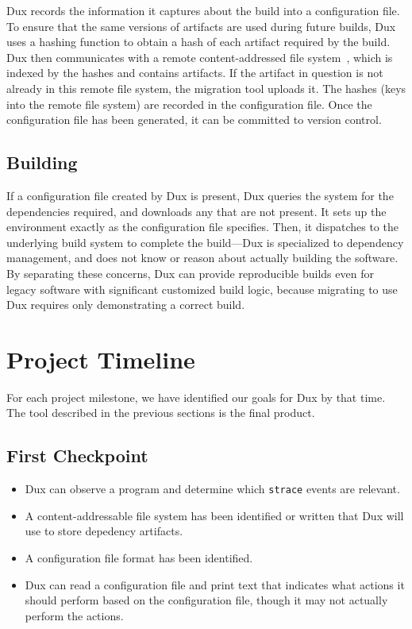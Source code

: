 \documentclass[10pt,conference]{IEEEtran}
\begin{document}
Dux records the information it captures about the build into a configuration file.
To ensure that the same versions of artifacts are used during future builds,
Dux uses a hashing function to obtain a hash of each artifact required by the build.
Dux then communicates with a remote content-addressed file system~\cite{venti},
which is indexed by the hashes and contains artifacts.
If the artifact in question is not already in this remote file system, the migration tool uploads it.
The hashes (keys into the remote file system) are recorded in the configuration file.
Once the configuration file has been generated, it can be committed to version control.

\subsection{Building}

If a configuration file created by Dux is present, Dux queries the system for the dependencies required,
and downloads any that are not present.
It sets up the environment exactly as the configuration file specifies.
Then, it dispatches to the underlying build system to complete the build---Dux is specialized
to dependency management, and does not know or reason about actually building the software.
By separating these concerns, Dux can provide reproducible builds even for legacy software
with significant customized build logic, because migrating to use Dux requires only
demonstrating a correct build.

\section{Project Timeline}

For each project milestone, we have identified our goals for Dux by that time. The tool described
in the previous sections is the final product.

\subsection{First Checkpoint}

\begin{itemize}
\item{Dux can observe a program and determine which \texttt{strace} events are relevant.}
\item{A content-addressable file system has been identified or written
that Dux will use to store depedency artifacts.}
\item{A configuration file format has been identified.}
\item{Dux can read a configuration file and print text that indicates what actions it
should perform based on the configuration file, though it may not actually perform the actions.}
\end{itemize}
\end{document}
